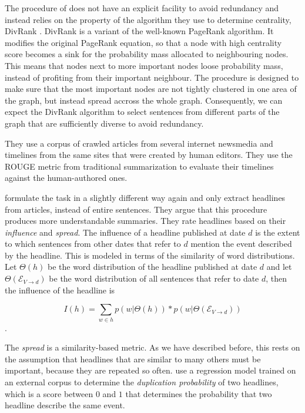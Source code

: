 \documentclass[a4paper,BCOR=10mm]{report}
\numberwithin{lemma}{chapter}
\numberwithin{definition}{chapter}
\begin{document}
The procedure of \citet{yan-trans} does not have an explicit facility to avoid redundancy and instead relies on the property of the algorithm they use to determine centrality, DivRank \citep{divrank}. DivRank is a variant of the well-known PageRank \citep{pagerank} algorithm. It modifies the original PageRank equation, so that a node with high centrality score becomes a sink for the probability mass allocated to neighbouring nodes. This means that nodes next to more important nodes loose probability mass, instead of profiting from their important neighbour. The procedure is designed to make sure that the most important nodes are not tightly clustered in one area of the graph, but instead spread accross the whole graph. Consequently, we can expect the DivRank algorithm to select sentences from different parts of the graph that are sufficiently diverse to avoid redundancy.

They use a corpus of crawled articles from several internet newsmedia and timelines from the same sites that were created by human editors.
They use the ROUGE \citep{rouge} metric from traditional summarization to evaluate their timelines against the human-authored ones.

\citet{tran-headlines} formulate the task in a slightly different way again and only extract headlines from articles, instead of entire sentences. They argue that this procedure produces more understandable summaries.
They rate headlines based on their \textit{influence} and \textit{spread}.
The influence of a headline published at date $d$ is the extent to which sentences from other dates that refer to $d$ mention the event described by the headline.
This is modeled in terms of the similarity of word distributions. Let $\Theta(h)$ be the word distribution of the headline published at date $d$ and let $\Theta(\mathcal{E}_{V \rightarrow d})$ be the word distribution of all sentences that refer to date $d$, then the influence of the headline is

\begin{equation}
I(h) = \sum_{w \in h} p(w|\Theta(h)) * p(w|\Theta(\mathcal{E}_{V \rightarrow d}))
\end{equation}.

The \textit{spread} is a similarity-based metric. As we have described before, this rests on the assumption that headlines that are similar to many others must be important, because they are repeated so often.
\citeauthor{tran-headlines} use a regression model trained on an external corpus to determine the \textit{duplication probability} of two headlines, which is a score between $0$ and $1$ that determines the probability that two headline describe the same event.
\end{document}
